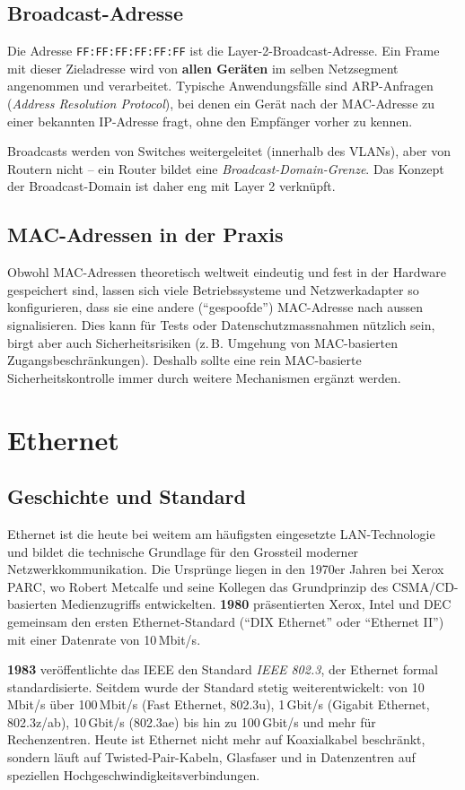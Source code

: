 \documentclass[11pt, oneside, numbers=nönddot]{scrbook}
\begin{document}
\subsection{Broadcast-Adresse}
Die Adresse \texttt{FF:FF:FF:FF:FF:FF} ist die Layer-2-Broadcast-Adresse. Ein Frame mit dieser Zieladresse wird von \textbf{allen Geräten} im selben Netzsegment angenommen und verarbeitet. Typische Anwendungsfälle sind ARP-Anfragen (\textit{Address Resolution Protocol}), bei denen ein Gerät nach der MAC-Adresse zu einer bekannten IP-Adresse fragt, ohne den Empfänger vorher zu kennen.

Broadcasts werden von Switches weitergeleitet (innerhalb des VLANs), aber von Routern nicht -- ein Router bildet eine \textit{Broadcast-Domain-Grenze}. Das Konzept der Broadcast-Domain ist daher eng mit Layer 2 verknüpft.

\subsection{MAC-Adressen in der Praxis}
Obwohl MAC-Adressen theoretisch weltweit eindeutig und fest in der Hardware gespeichert sind, lassen sich viele Betriebssysteme und Netzwerkadapter so konfigurieren, dass sie eine andere (``gespoofde'') MAC-Adresse nach aussen signalisieren. Dies kann für Tests oder Datenschutzmassnahmen nützlich sein, birgt aber auch Sicherheitsrisiken (z.\,B. Umgehung von MAC-basierten Zugangsbeschränkungen). Deshalb sollte eine rein MAC-basierte Sicherheitskontrolle immer durch weitere Mechanismen ergänzt werden.

\newpage

\section{Ethernet}
\subsection{Geschichte und Standard}
Ethernet ist die heute bei weitem am häufigsten eingesetzte LAN-Technologie und bildet die technische Grundlage für den Grossteil moderner Netzwerkkommunikation. Die Ursprünge liegen in den 1970er Jahren bei Xerox PARC, wo Robert Metcalfe und seine Kollegen das Grundprinzip des CSMA/CD-basierten Medienzugriffs entwickelten. \textbf{1980} präsentierten Xerox, Intel und DEC gemeinsam den ersten Ethernet-Standard (``DIX Ethernet'' oder ``Ethernet II'') mit einer Datenrate von 10\,Mbit/s.

\textbf{1983} veröffentlichte das IEEE den Standard \textit{IEEE 802.3}, der Ethernet formal standardisierte. Seitdem wurde der Standard stetig weiterentwickelt: von 10\,Mbit/s über 100\,Mbit/s (Fast Ethernet, 802.3u), 1\,Gbit/s (Gigabit Ethernet, 802.3z/ab), 10\,Gbit/s (802.3ae) bis hin zu 100\,Gbit/s und mehr für Rechenzentren. Heute ist Ethernet nicht mehr auf Koaxialkabel beschränkt, sondern läuft auf Twisted-Pair-Kabeln, Glasfaser und in Datenzentren auf speziellen Hochgeschwindigkeitsverbindungen.
\end{document}
